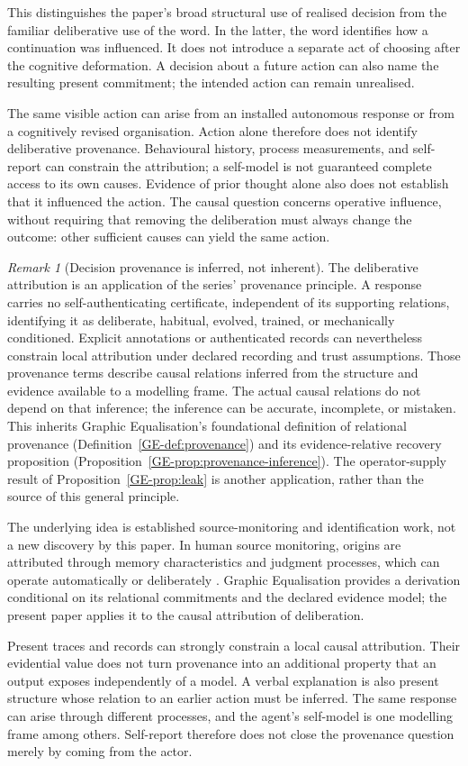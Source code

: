\documentclass[11pt,a4paper]{article}
\theoremstyle{remark}
\newtheorem{remark}[definition]{Remark}
\begin{document}
This distinguishes the paper's broad structural use of realised decision from
the familiar deliberative use of the word. In the latter, the word identifies
how a continuation was influenced. It does not introduce a separate act of
choosing after the cognitive deformation. A decision about a future action
can also name the resulting present commitment; the intended action can
remain unrealised.

The same visible action can arise from an installed autonomous response or
from a cognitively revised organisation. Action alone therefore does not
identify deliberative provenance. Behavioural history, process measurements,
and self-report can constrain the attribution; a self-model is not guaranteed
complete access to its own causes. Evidence of prior thought alone also does
not establish that it influenced the action. The causal question concerns
operative influence, without requiring that removing the deliberation must
always change the outcome: other sufficient causes can yield the same action.

\begin{remark}[Decision provenance is inferred, not inherent]\label{rem:decision-provenance}
The deliberative attribution is an application of the series' provenance
principle. A response carries no self-authenticating certificate, independent
of its supporting relations, identifying it as deliberate, habitual, evolved,
trained, or mechanically conditioned. Explicit annotations or authenticated
records can nevertheless constrain local attribution under declared recording
and trust assumptions. Those provenance terms describe causal relations
inferred from the structure and evidence
available to a modelling frame. The actual causal relations do not depend on
that inference; the inference can be accurate, incomplete, or mistaken.
This inherits Graphic Equalisation's foundational definition of relational
provenance (Definition~\ref{GE-def:provenance}) and its evidence-relative
recovery proposition (Proposition~\ref{GE-prop:provenance-inference}). The
operator-supply result of Proposition~\ref{GE-prop:leak} is another application,
rather than the source of this general principle.

The underlying idea is established source-monitoring and identification
work, not a new discovery by this paper. In human source monitoring, origins
are attributed through memory characteristics and judgment processes, which
can operate automatically or deliberately \citep{johnson1993}. Graphic
Equalisation provides a derivation conditional on its relational commitments
and the declared evidence model;
the present paper applies it to the causal attribution of deliberation.

Present traces and records can strongly constrain a local causal attribution.
Their evidential value does not turn provenance into an additional property
that an output exposes independently of a model. A verbal explanation is
also present structure whose relation to an earlier action must be inferred.
The same response can arise through different processes, and the agent's
self-model is one modelling frame among others. Self-report therefore does
not close the provenance question merely by coming from the actor.
\end{remark}
\end{document}
